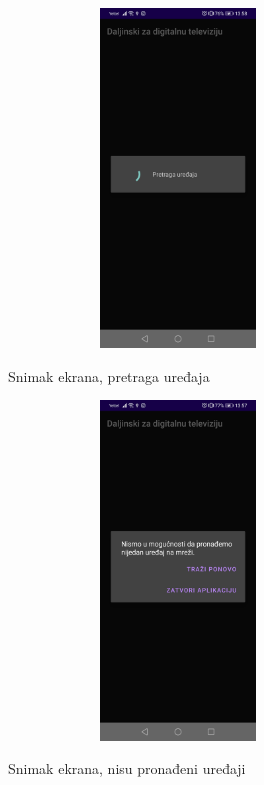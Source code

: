 \documentclass[implementacija.tex]{subfiles}
\begin{document}
\begin{figure}[h!]
\centering
\begin{minipage}{.5\textwidth}
  \centering
  \label{fig:pretraga}
  \includegraphics[width=9cm,height=9cm,keepaspectratio]{Implementacija/snimci_ekrana/3_pretraga_uredjaja.jpg}
  \caption{Snimak ekrana, pretraga uređaja}
\end{minipage}%
\begin{minipage}{.5\textwidth}
   \centering
  \label{fig:nema_uredjaja}
  \includegraphics[width=9cm,height=9cm,keepaspectratio]{Implementacija/snimci_ekrana/4_uredjaji_nisu_pronadjeni.jpg}
  \caption{Snimak ekrana, nisu pronađeni uređaji}
\end{minipage}
\end{figure}
\end{document}

